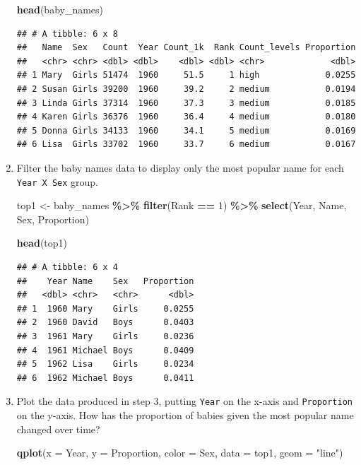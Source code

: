 \documentclass[
]{book}
\newenvironment{Shaded}{\begin{snugshade}}{\end{snugshade}}
\newcommand{\DataTypeTok}[1]{\textcolor[rgb]{0.13,0.29,0.53}{#1}}
\newcommand{\DecValTok}[1]{\textcolor[rgb]{0.00,0.00,0.81}{#1}}
\newcommand{\KeywordTok}[1]{\textcolor[rgb]{0.13,0.29,0.53}{\textbf{#1}}}
\newcommand{\NormalTok}[1]{#1}
\newcommand{\OperatorTok}[1]{\textcolor[rgb]{0.81,0.36,0.00}{\textbf{#1}}}
\newcommand{\StringTok}[1]{\textcolor[rgb]{0.31,0.60,0.02}{#1}}
\begin{document}
\begin{enumerate}
\begin{Shaded}
\begin{Highlighting}[]
\KeywordTok{head}\NormalTok{(baby\_names)}
\end{Highlighting}
\end{Shaded}

\begin{verbatim}
## # A tibble: 6 x 8
##   Name  Sex   Count  Year Count_1k  Rank Count_levels Proportion
##   <chr> <chr> <dbl> <dbl>    <dbl> <dbl> <chr>             <dbl>
## 1 Mary  Girls 51474  1960     51.5     1 high             0.0255
## 2 Susan Girls 39200  1960     39.2     2 medium           0.0194
## 3 Linda Girls 37314  1960     37.3     3 medium           0.0185
## 4 Karen Girls 36376  1960     36.4     4 medium           0.0180
## 5 Donna Girls 34133  1960     34.1     5 medium           0.0169
## 6 Lisa  Girls 33702  1960     33.7     6 medium           0.0167
\end{verbatim}
\item
  Filter the baby names data to display only the most popular name for each \texttt{Year\ X\ Sex} group.

\begin{Shaded}
\begin{Highlighting}[]
\NormalTok{top1 \textless{}{-}}\StringTok{ }
\StringTok{  }\NormalTok{baby\_names }\OperatorTok{\%\textgreater{}\%}
\StringTok{  }\KeywordTok{filter}\NormalTok{(Rank }\OperatorTok{==}\StringTok{ }\DecValTok{1}\NormalTok{) }\OperatorTok{\%\textgreater{}\%}
\StringTok{  }\KeywordTok{select}\NormalTok{(Year, Name, Sex, Proportion)}

\KeywordTok{head}\NormalTok{(top1)}
\end{Highlighting}
\end{Shaded}

\begin{verbatim}
## # A tibble: 6 x 4
##    Year Name    Sex   Proportion
##   <dbl> <chr>   <chr>      <dbl>
## 1  1960 Mary    Girls     0.0255
## 2  1960 David   Boys      0.0403
## 3  1961 Mary    Girls     0.0236
## 4  1961 Michael Boys      0.0409
## 5  1962 Lisa    Girls     0.0234
## 6  1962 Michael Boys      0.0411
\end{verbatim}
\item
  Plot the data produced in step 3, putting \texttt{Year} on the x-axis and \texttt{Proportion} on the y-axis. How has the proportion of babies given the most popular name changed over time?

\begin{Shaded}
\begin{Highlighting}[]
\KeywordTok{qplot}\NormalTok{(}\DataTypeTok{x =}\NormalTok{ Year, }
      \DataTypeTok{y =}\NormalTok{ Proportion, }
      \DataTypeTok{color =}\NormalTok{ Sex, }
      \DataTypeTok{data =}\NormalTok{ top1, }
      \DataTypeTok{geom =} \StringTok{"line"}\NormalTok{)}
\end{Highlighting}
\end{Shaded}


\end{enumerate}
\end{document}
